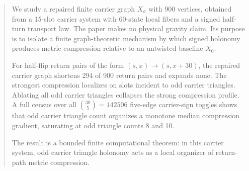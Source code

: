 \begin{abstract}
We study a repaired finite carrier graph \(X_\sigma\) with 900 vertices, obtained from a 15-slot carrier system with 60-state local fibers and a signed half-turn transport law. The paper makes no physical gravity claim. Its purpose is to isolate a finite graph-theoretic mechanism by which signed holonomy produces metric compression relative to an untwisted baseline \(X_0\).

For half-flip return pairs of the form \((s,x)\to(s,x+30)\), the repaired carrier graph shortens 294 of 900 return pairs and expands none. The strongest compression localizes on slots incident to odd carrier triangles. Ablating all odd carrier triangles collapses the strong compression profile. A full census over all \(\binom{30}{5}=142506\) five-edge carrier-sign toggles shows that odd carrier triangle count organizes a monotone median compression gradient, saturating at odd triangle counts 8 and 10.

The result is a bounded finite computational theorem: in this carrier system, odd carrier triangle holonomy acts as a local organizer of return-path metric compression.
\end{abstract}
